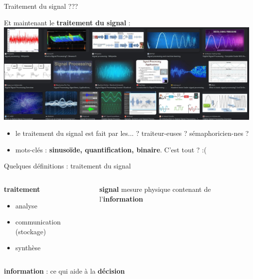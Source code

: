 \documentclass[9pt, aspectratio=169]{beamer}
\begin{document}
\begin{frame}{\og Traitement du signal \fg{} ???} %

Et maintenant le \textbf{traitement du signal} :
\pause
\includegraphics[width=\textwidth]{fig/search_results_signal_proc.jpg}
\pause
\begin{itemize}
    \item le traitement du signal est fait par les... ? \pause traiteur-euses ? \pause sémaphoricien-nes ?
    \pause
    \item mots-clés : \textbf{sinusoïde, quantification, binaire}. C'est tout ?  :(
\end{itemize}

\end{frame}

\begin{frame}{Quelques définitions : \og traitement du signal \fg{}} %
\begin{columns}
   \begin{column}{0.4\textwidth}
        \begin{myblockred}{\textbf{traitement}}
        \begin{itemize}
            \item analyse
            \item communication (stockage)
            \item synthèse
        \end{itemize}
        \end{myblockred}
        
   \end{column}
   \begin{column}{0.59\textwidth}
		\begin{myblockred}{\textbf{signal}}
        mesure physique contenant de l'\textbf{information}
        \end{myblockred}
   \end{column}
\end{columns}

\vspace{1cm}
\textbf{information} : ce qui aide à la \textbf{décision}

\end{frame}
\end{document}
